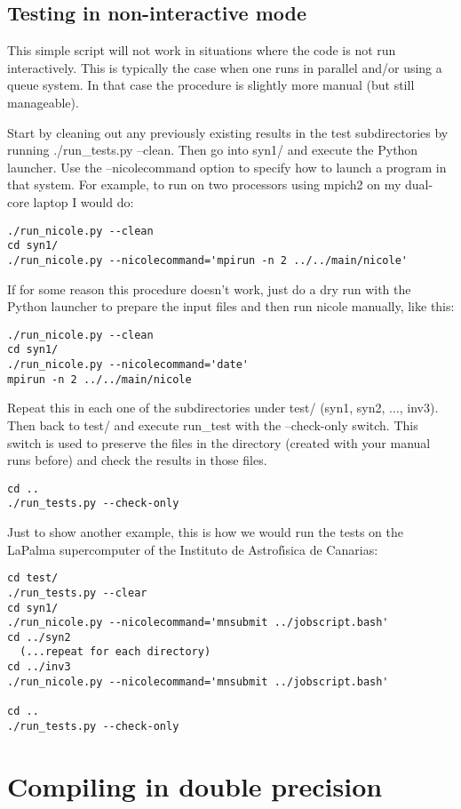 \subsection{Testing in non-interactive mode}

This simple script will not work in situations where the code is not
run interactively. This is typically the case when one runs in
parallel and/or using a queue system. In that case the procedure is
slightly more manual (but still manageable). 

Start by cleaning out any previously existing results in the test
subdirectories by running ./run\_tests.py --clean. Then
go into syn1/ and execute the Python launcher. Use the
--nicolecommand option to specify how to launch a program in that
system. For example, to run on two processors using mpich2 on my
dual-core laptop I would do: 
\begin{verbatim}
./run_nicole.py --clean
cd syn1/
./run_nicole.py --nicolecommand='mpirun -n 2 ../../main/nicole'
\end{verbatim}
If for some reason this procedure doesn't work, just do a dry run with
the Python launcher to prepare the input files and then run nicole
manually, like this:
\begin{verbatim}
./run_nicole.py --clean
cd syn1/
./run_nicole.py --nicolecommand='date'
mpirun -n 2 ../../main/nicole
\end{verbatim}

Repeat this in each one of the subdirectories under test/ (syn1,
syn2, ..., inv3). Then back to test/ and execute run\_test with the
--check-only switch. This switch is used to preserve the files in the
directory (created with your manual runs before) and check the results
in those files.
\begin{verbatim}
cd ..
./run_tests.py --check-only
\end{verbatim}

Just to show another example, this is how we would run the tests on
the LaPalma supercomputer of the Instituto de Astrof\'\i sica de
Canarias:
\begin{verbatim}
cd test/
./run_tests.py --clear
cd syn1/
./run_nicole.py --nicolecommand='mnsubmit ../jobscript.bash'
cd ../syn2
  (...repeat for each directory)
cd ../inv3
./run_nicole.py --nicolecommand='mnsubmit ../jobscript.bash'

cd ..
./run_tests.py --check-only
\end{verbatim}

\section{Compiling in double precision}
\label{sec:double}

